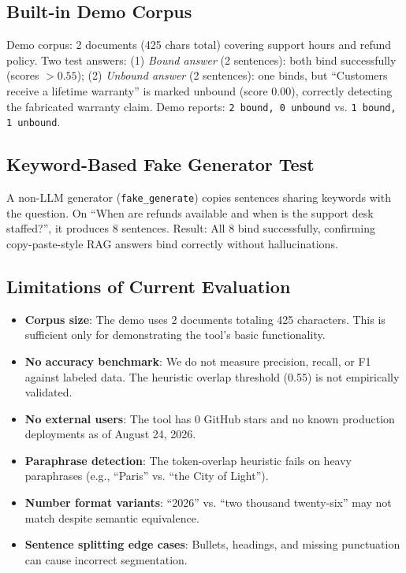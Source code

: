 \documentclass{article}
\begin{document}
\subsection{Built-in Demo Corpus}

Demo corpus: 2 documents (425 chars total) covering support hours and refund policy. Two test answers: (1) \textit{Bound answer} (2 sentences): both bind successfully (scores $>0.55$); (2) \textit{Unbound answer} (2 sentences): one binds, but ``Customers receive a lifetime warranty'' is marked unbound (score 0.00), correctly detecting the fabricated warranty claim. Demo reports: \texttt{2 bound, 0 unbound} vs. \texttt{1 bound, 1 unbound}.

\subsection{Keyword-Based Fake Generator Test}

A non-LLM generator (\texttt{fake\_generate}) copies sentences sharing keywords with the question. On ``When are refunds available and when is the support desk staffed?'', it produces 8 sentences. Result: All 8 bind successfully, confirming copy-paste-style RAG answers bind correctly without hallucinations.

\subsection{Limitations of Current Evaluation}

\begin{itemize}
\item \textbf{Corpus size}: The demo uses 2 documents totaling 425 characters. This is sufficient only for demonstrating the tool's basic functionality.
\item \textbf{No accuracy benchmark}: We do not measure precision, recall, or F1 against labeled data. The heuristic overlap threshold (0.55) is not empirically validated.
\item \textbf{No external users}: The tool has 0 GitHub stars and no known production deployments as of August 24, 2026.
\item \textbf{Paraphrase detection}: The token-overlap heuristic fails on heavy paraphrases (e.g., ``Paris'' vs. ``the City of Light'').
\item \textbf{Number format variants}: ``2026'' vs. ``two thousand twenty-six'' may not match despite semantic equivalence.
\item \textbf{Sentence splitting edge cases}: Bullets, headings, and missing punctuation can cause incorrect segmentation.
\end{itemize}
\end{document}
